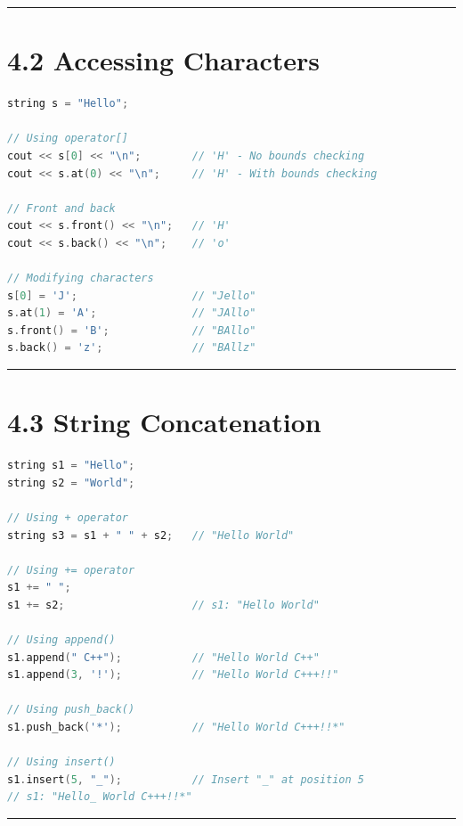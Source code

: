 \begin{center}\rule{0.5\linewidth}{0.5pt}\end{center}

\hypertarget{accessing-characters}{%
\section{4.2 Accessing Characters}\label{accessing-characters}}

\begin{lstlisting}[language={C++}]
string s = "Hello";

// Using operator[]
cout << s[0] << "\n";        // 'H' - No bounds checking
cout << s.at(0) << "\n";     // 'H' - With bounds checking

// Front and back
cout << s.front() << "\n";   // 'H'
cout << s.back() << "\n";    // 'o'

// Modifying characters
s[0] = 'J';                  // "Jello"
s.at(1) = 'A';               // "JAllo"
s.front() = 'B';             // "BAllo"
s.back() = 'z';              // "BAllz"
\end{lstlisting}

\begin{center}\rule{0.5\linewidth}{0.5pt}\end{center}

\hypertarget{string-concatenation}{%
\section{4.3 String Concatenation}\label{string-concatenation}}

\begin{lstlisting}[language={C++}]
string s1 = "Hello";
string s2 = "World";

// Using + operator
string s3 = s1 + " " + s2;   // "Hello World"

// Using += operator
s1 += " ";
s1 += s2;                    // s1: "Hello World"

// Using append()
s1.append(" C++");           // "Hello World C++"
s1.append(3, '!');           // "Hello World C+++!!"

// Using push_back()
s1.push_back('*');           // "Hello World C+++!!*"

// Using insert()
s1.insert(5, "_");           // Insert "_" at position 5
// s1: "Hello_ World C+++!!*"
\end{lstlisting}

\begin{center}\rule{0.5\linewidth}{0.5pt}\end{center}

